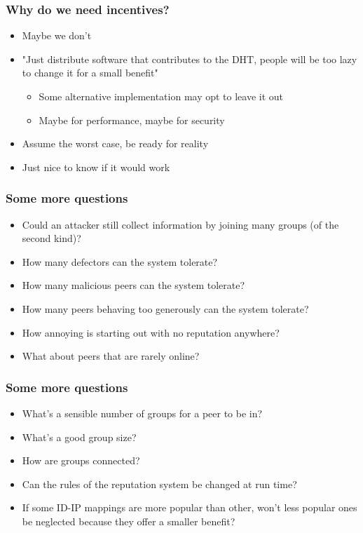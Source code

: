 \documentclass{beamer}
\begin{document}
\begin{frame}
\end{frame}

\begin{frame}
  \frametitle{Why do we need incentives?}
  \begin{itemize}
    \item Maybe we don't
    \item "Just distribute software that contributes to the DHT, people will be
          too lazy to change it for a small benefit"
          \begin{itemize}
            \item Some alternative implementation may opt to leave it out
            \item Maybe for performance, maybe for security
          \end{itemize}
    \item Assume the worst case, be ready for reality
    \item Just nice to know if it would work
  \end{itemize}
\end{frame}

\begin{frame}
  \frametitle{Some more questions}
  \begin{itemize}
    \item Could an attacker still collect information by joining many groups (of
          the second kind)?
    \item How many defectors can the system tolerate?
    \item How many malicious peers can the system tolerate?
    \item How many peers behaving too generously can the system tolerate?
    \item How annoying is starting out with no reputation anywhere?
    \item What about peers that are rarely online?
  \end{itemize}
\end{frame}

\begin{frame}
  \frametitle{Some more questions}
  \begin{itemize}
    \item What's a sensible number of groups for a peer to be in?
    \item What's a good group size?
    \item How are groups connected?
    \item Can the rules of the reputation system be changed at run time?
    \item If some ID-IP mappings are more popular than other, won't less popular
          ones be neglected because they offer a smaller benefit?
  \end{itemize}
\end{frame}
\end{document}
